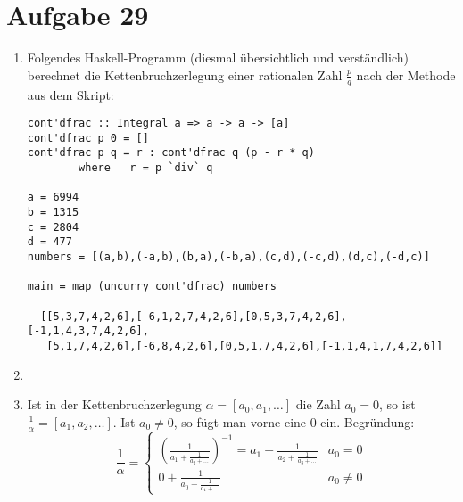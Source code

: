 \section*{Aufgabe 29}
\begin{enumerate}[(1)]
	\item
	Folgendes Haskell-Programm (diesmal übersichtlich und verständlich) berechnet
	die Kettenbruchzerlegung einer rationalen Zahl $\frac{p}{q}$ nach der Methode
	aus dem Skript:
	\begin{lstlisting}
cont'dfrac :: Integral a => a -> a -> [a]
cont'dfrac p 0 = []
cont'dfrac p q = r : cont'dfrac q (p - r * q)
        where   r = p `div` q 

a = 6994
b = 1315
c = 2804
d = 477
numbers = [(a,b),(-a,b),(b,a),(-b,a),(c,d),(-c,d),(d,c),(-d,c)]

main = map (uncurry cont'dfrac) numbers

  [[5,3,7,4,2,6],[-6,1,2,7,4,2,6],[0,5,3,7,4,2,6],[-1,1,4,3,7,4,2,6],
   [5,1,7,4,2,6],[-6,8,4,2,6],[0,5,1,7,4,2,6],[-1,1,4,1,7,4,2,6]]
	\end{lstlisting}
	\item 
	\item Ist in der Kettenbruchzerlegung $\alpha = [a_0, a_1, \dots]$ die
		Zahl $a_0 = 0$, so ist $\frac{1}{\alpha} = [a_1, a_2, \dots]$.
		Ist $a_0 \not= 0$, so fügt man vorne eine $0$ ein. Begründung:
		\[ \frac{1}{\alpha} = 
			\begin{cases}
				\left(\frac{1}{a_1+\frac{1}{a_2+\dots}}\right)^{-1} =
				a_1 + \frac{1}{a_2+\frac{1}{a_3+\dots}} &a_0 = 0 \\
				0 + \frac{1}{a_0+\frac{1}{a_1+\dots}} &a_0 \not= 0
			\end{cases}
				\]
\end{enumerate}

